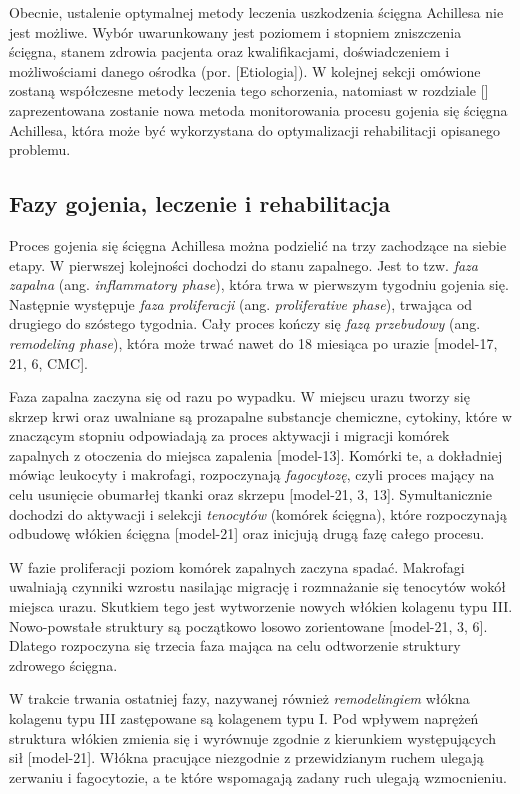 Obecnie, ustalenie optymalnej metody leczenia uszkodzenia ścięgna Achillesa nie jest możliwe. Wybór uwarunkowany jest poziomem i stopniem zniszczenia ścięgna, stanem zdrowia pacjenta oraz kwalifikacjami, doświadczeniem i możliwościami danego ośrodka (por. [Etiologia]). W kolejnej sekcji omówione zostaną współczesne metody leczenia tego schorzenia, natomiast w rozdziale [] zaprezentowana zostanie nowa metoda monitorowania procesu gojenia się ścięgna Achillesa, która może być wykorzystana do optymalizacji rehabilitacji opisanego problemu. 

\subsection{Fazy gojenia, leczenie i rehabilitacja}
\label{gojenie}

Proces gojenia się ścięgna Achillesa można podzielić na trzy zachodzące na siebie etapy. W pierwszej kolejności dochodzi do stanu zapalnego. Jest to tzw. \textit{faza zapalna} (ang. \textit{inflammatory phase}), która trwa w pierwszym tygodniu gojenia się. Następnie występuje \textit{faza proliferacji} (ang. \textit{proliferative phase}), trwająca od drugiego do szóstego tygodnia. Cały proces kończy się \textit{fazą przebudowy} (ang. \textit{remodeling phase}), która może trwać nawet do 18 miesiąca po urazie [model-17, 21, 6, CMC]. 

Faza zapalna zaczyna się od razu po wypadku. W miejscu urazu tworzy się skrzep krwi oraz uwalniane są prozapalne substancje chemiczne, cytokiny, które w znaczącym stopniu odpowiadają za proces aktywacji i migracji komórek zapalnych z otoczenia do miejsca zapalenia [model-13]. Komórki te, a dokładniej mówiąc leukocyty i makrofagi, rozpoczynają \textit{fagocytozę}, czyli proces mający na celu usunięcie obumarłej tkanki oraz skrzepu [model-21, 3, 13]. Symultanicznie dochodzi do aktywacji i selekcji \textit{tenocytów} (komórek ścięgna), które rozpoczynają odbudowę włókien ścięgna [model-21] oraz inicjują drugą fazę całego procesu.

W fazie proliferacji poziom komórek zapalnych zaczyna spadać. Makrofagi uwalniają czynniki wzrostu nasilając migrację i rozmnażanie się tenocytów wokół miejsca urazu. Skutkiem tego jest wytworzenie nowych włókien kolagenu typu III. Nowo-powstałe struktury są początkowo losowo zorientowane [model-21, 3, 6]. Dlatego rozpoczyna się trzecia faza mająca na celu odtworzenie struktury zdrowego ścięgna.

W trakcie trwania ostatniej fazy, nazywanej również \textit{remodelingiem} włókna kolagenu typu III zastępowane są kolagenem typu I. Pod wpływem naprężeń struktura włókien zmienia się i wyrównuje zgodnie z kierunkiem występujących sił [model-21]. Włókna pracujące niezgodnie z przewidzianym ruchem ulegają zerwaniu i fagocytozie, a te które wspomagają zadany ruch ulegają wzmocnieniu. 

